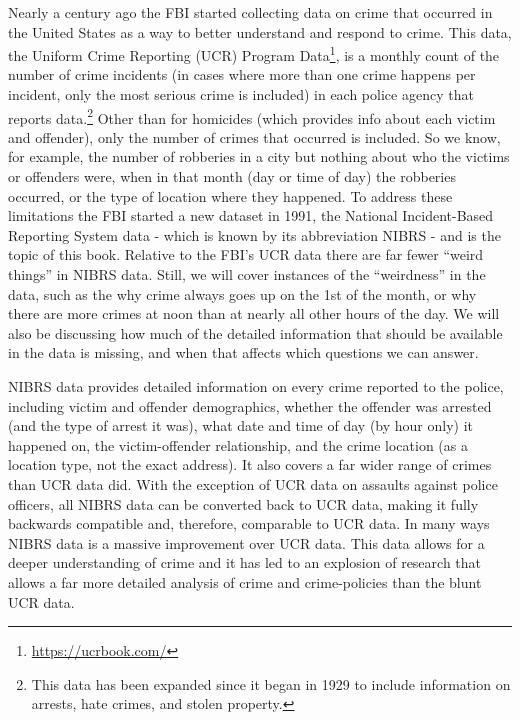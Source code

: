 \documentclass[
]{krantz}
\renewcommand{\href}[2]{#2\footnote{\url{#1}}}
\begin{document}
Nearly a century ago the FBI started collecting data on
crime that occurred in the United States as a way to better
understand and respond to crime. This data, the
\href{https://ucrbook.com/}{Uniform Crime Reporting (UCR)
Program Data}, is a monthly count of the number of crime
incidents (in cases where more than one crime happens per
incident, only the most serious crime is included) in each
police agency that reports data.\footnote{This data has been
  expanded since it began in 1929 to include information on
  arrests, hate crimes, and stolen property.} Other than for
homicides (which provides info about each victim and
offender), only the number of crimes that occurred is
included. So we know, for example, the number of robberies
in a city but nothing about who the victims or offenders
were, when in that month (day or time of day) the robberies
occurred, or the type of location where they happened. To
address these limitations the FBI started a new dataset in
1991, the National Incident-Based Reporting System data -
which is known by its abbreviation NIBRS - and is the topic
of this book. Relative to the FBI's UCR data there are far
fewer ``weird things'' in NIBRS data. Still, we will cover
instances of the ``weirdness'' in the data, such as the why
crime always goes up on the 1st of the month, or why there
are more crimes at noon than at nearly all other hours of
the day. We will also be discussing how much of the detailed
information that should be available in the data is missing,
and when that affects which questions we can answer.

NIBRS data provides detailed information on every crime
reported to the police, including victim and offender
demographics, whether the offender was arrested (and the
type of arrest it was), what date and time of day (by hour
only) it happened on, the victim-offender relationship, and
the crime location (as a location type, not the exact
address). It also covers a far wider range of crimes than
UCR data did. With the exception of UCR data on assaults
against police officers, all NIBRS data can be converted
back to UCR data, making it fully backwards compatible and,
therefore, comparable to UCR data. In many ways NIBRS data
is a massive improvement over UCR data. This data allows for
a deeper understanding of crime and it has led to an
explosion of research that allows a far more detailed
analysis of crime and crime-policies than the blunt UCR
data.
\end{document}
